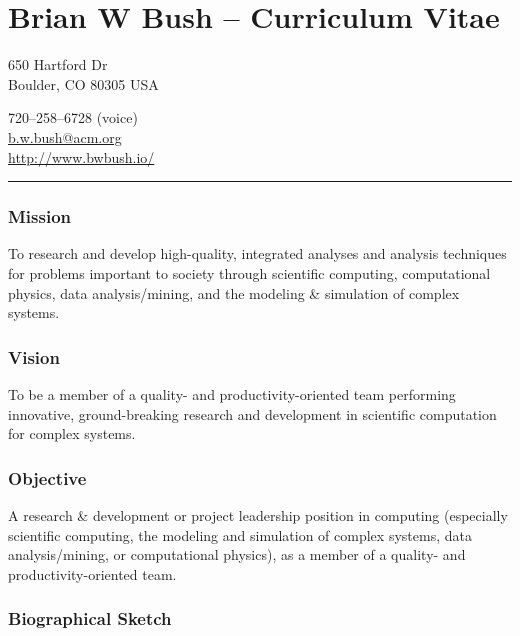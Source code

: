 \documentclass[]{article}
\begin{document}
\section{Brian W Bush -- Curriculum
Vitae}\label{brian-w-bush-curriculum-vitae}

650 Hartford Dr\\Boulder, CO 80305 USA

720--258--6728
(voice)\\\href{mailto:b.w.bush@acm.org}{b.w.bush@acm.org}\\\url{http://www.bwbush.io/}

\begin{center}\rule{3in}{0.4pt}\end{center}

\subsubsection{Mission}\label{mission}

To research and develop high-quality, integrated analyses and analysis
techniques for problems important to society through scientific
computing, computational physics, data analysis/mining, and the modeling
\& simulation of complex systems.

\subsubsection{Vision}\label{vision}

To be a member of a quality- and productivity-oriented team performing
innovative, ground-breaking research and development in scientific
computation for complex systems.

\subsubsection{Objective}\label{objective}

A research \& development or project leadership position in computing
(especially scientific computing, the modeling and simulation of complex
systems, data analysis/mining, or computational physics), as a member of
a quality- and productivity-oriented team.

\subsubsection{Biographical Sketch}\label{biographical-sketch}
\end{document}

